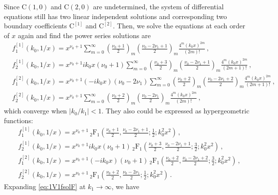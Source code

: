 \documentclass[a4paper,11pt]{article}
\newcommand{\nn}{\nonumber}
\begin{document}
Since $\text{C}(1,0)$ and $\text{C}(2,0)$ are undetermined, the system of differential equations still has two linear independent solutions and corresponding two boundary coefficients $\text{C}^{[1]}$ and $\text{C}^{[2]}$.
Then, we solve the equations at each order of $x$ again and find the power series solutions are
\begin{align}
&f_1^{[1]}(k_0,1/x) =x^{\nu_0+1} \sum_{m=0}^\infty  \left(\frac{\nu _0+1}{2}\right)_m \left(\frac{\nu _0-2 \nu _1+1}{2}\right)_m \frac{4^m \left(k_0 x\right)^{2 m} }{(2 m)!} \,, \nn\\
&f_2^{[1]}(k_0,1/x) = x^{\nu_0+1}
i k_0 x (\nu_0+1)  \sum_{m=0}^\infty   \left(\frac{\nu _0+3}{2}\right)_m \left(\frac{\nu _0-2 \nu _1+1}{2}\right)_m \frac{4^m \left(k_0 x\right)^{2 m} }{(2 m+1)!}  \,, \nn\\
&f_1^{[2]}(k_0,1/x)= x^{\nu_0+1} (-i k_0 x) (\nu_0-2\nu_1) \sum_{m=0}^\infty  \left(\frac{\nu _0+2}{2}\right)_m \left(\frac{\nu _0-2 \nu _1+2}{2}\right)_m \frac{4^m \left(k_0 x\right)^{2 m} }{(2 m+1)!} \,, \nn\\
&f_2^{[2]}(k_0,1/x)  = x^{\nu_0+1} \sum_{m=0}^\infty  \left(\frac{\nu _0+2}{2}\right)_m \left(\frac{\nu _0-2 \nu _1}{2}\right)_m \frac{4^m \left(k_0 x\right)^{2 m} }{(2 m)!}    \,, \label{eq:1V1fsolserieskninf}
\end{align}
which converge when $|k_0/k_1|<1$. They also could be expressed as hypergeometric functions:
\begin{align}
&f_1^{[1]}(k_0,1/x) = x^{\nu_0+1} \, _2\text{F}_1\left(\frac{\nu _0+1}{2},\frac{\nu _0-2\nu_1+1}{2};\frac{1}{2};k_0^2 x^2\right) \,, \nn\\
&f_2^{[1]}(k_0,1/x) = x^{\nu_0+1}
i k_0 x (\nu_0+1) \,  _2\text{F}_1\left(\frac{\nu_0+3}{2},\frac{\nu _0-2\nu_1+1}{2};\frac{3}{2};k_0^2 x^2\right)  \,, \nn\\
&f_1^{[2]}(k_0,1/x) = x^{\nu_0+1}(-i k_0 x) (\nu_0+1) 
 \, _2\text{F}_1\left(\frac{\nu_0+2}{2},\frac{\nu _0-2\nu_1+2}{2};\frac{3}{2};k_0^2 x^2\right) \,, \nn\\
&f_2^{[2]}(k_0,1/x)  = x^{\nu_0+1} \, _2\text{F}_1\left(\frac{\nu_0+2}{2},\frac{\nu_0-2\nu_1}{2};\frac{1}{2};k_0^2 x^2\right) \,. \label{eq:1V1fsolF}
\end{align}
Expanding \eqref{eq:1V1fsolF} at $k_1 \to \infty$, we have 
\end{document}
